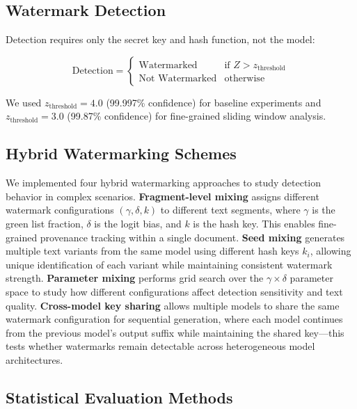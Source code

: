 \documentclass[12pt,letterpaper]{article}
\begin{document}
\subsection{Watermark Detection}

Detection requires only the secret key and hash function, not the model:

\begin{equation}
    \text{Detection} = \begin{cases}
        \text{Watermarked} & \text{if } Z > z_{\text{threshold}} \\
        \text{Not Watermarked} & \text{otherwise}
    \end{cases}
\end{equation}

We used $z_{\text{threshold}} = 4.0$ (99.997\% confidence) for baseline experiments and $z_{\text{threshold}} = 3.0$ (99.87\% confidence) for fine-grained sliding window analysis.

\subsection{Hybrid Watermarking Schemes}

We implemented four hybrid watermarking approaches to study detection behavior in complex scenarios. \textbf{Fragment-level mixing} assigns different watermark configurations $(\gamma, \delta, k)$ to different text segments, where $\gamma$ is the green list fraction, $\delta$ is the logit bias, and $k$ is the hash key. This enables fine-grained provenance tracking within a single document. \textbf{Seed mixing} generates multiple text variants from the same model using different hash keys $k_i$, allowing unique identification of each variant while maintaining consistent watermark strength. \textbf{Parameter mixing} performs grid search over the $\gamma \times \delta$ parameter space to study how different configurations affect detection sensitivity and text quality. \textbf{Cross-model key sharing} allows multiple models to share the same watermark configuration for sequential generation, where each model continues from the previous model's output suffix while maintaining the shared key---this tests whether watermarks remain detectable across heterogeneous model architectures.

\subsection{Statistical Evaluation Methods}
\end{document}
